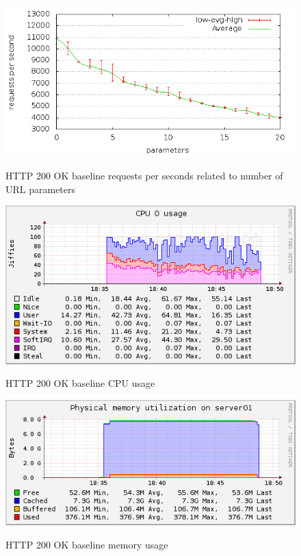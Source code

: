 \documentclass[Measurements]{subfiles}
\begin{document}
\begin{figure}[H]
\caption{HTTP 200 OK baseline requests per seconds related to number of URL parameters}
\centering
\includegraphics[scale=0.55] {images/results/200_with_naxsi_incremented_allowed_parameters/output.png}
\label{fig:Baseline performance measurement}
\end{figure}

\begin{figure}[H]
\centering
\caption{HTTP 200 OK baseline CPU usage}
\includegraphics[scale=0.7]{images/results/200_with_naxsi_incremented_allowed_parameters/cpu.png}
\label{fig:Baseline Nginx CPU usage}
\end{figure}

\begin{figure}[H]
\centering
\caption{HTTP 200 OK baseline memory usage}
\includegraphics[scale=0.7]{images/results/200_with_naxsi_incremented_allowed_parameters/memory.png}
\label{fig:Baseline Nginx memory usage}
\end{figure}
\end{document}
